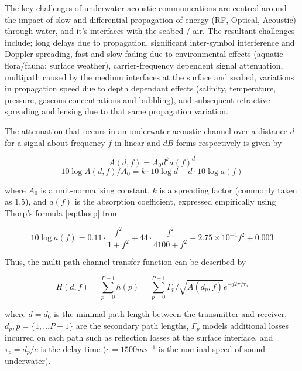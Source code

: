 \documentclass[runningheads,a4paper]{llncs}
\begin{document}
The key challenges of underwater acoustic communications are centred around the impact of slow and differential propagation of energy (RF, Optical, Acoustic) through water, and it's interfaces with the seabed / air.
The resultant challenges include; long delays due to propagation, significant inter-symbol interference and Doppler spreading, fast and slow fading due to environmental effects (aquatic flora/fauna; surface weather), carrier-frequency dependent signal attenuation, multipath caused by the medium interfaces at the surface and seabed, variations in propagation speed due to depth dependant effects (salinity, temperature, pressure, gaseous concentrations and bubbling), and subsequent refractive spreading and lensing due to that same propagation variation\cite{Partan2006}.

The attenuation that occurs in an underwater acoustic channel over a distance $d$ for a signal about frequency $f$ in linear and $dB$ forms respectively is given by

\begin{equation}
  \label{eq:acoattenuation}
  A(d,f) = A_0d^ka(f)^d
\end{equation}
\begin{equation}
  \label{eq:acoattenuationdb}
  10 \log A(d,f)/A_0 = k \cdot 10 \log d + d \cdot 10 \log a(f)
\end{equation}

where $A_0$ is a unit-normalising constant, $k$ is a spreading factor (commonly taken as 1.5), and $a(f)$ is the absorption coefficient, expressed empirically using Thorp's formula \eqref{eq:thorp} from \cite{Stojanovic2007}

\begin{equation}
  \label{eq:thorp}
  10 \log a(f) = 0.11 \cdot \frac{f^2}{1+f^2} + 44\cdot\frac{f^2}{4100+f^2}+ 2.75\times10^{-4} f^2 + 0.003
\end{equation}


Thus, the multi-path channel transfer function can be described by 

\begin{equation}
  \label{eq:acomultipath}
  H(d,f) =\sum_{p=0}^{P-1} h(p) = \sum_{p=0}^{P-1} \Gamma_p / \sqrt{A(d_p,f)}e^{-j 2 \pi f \tau_p}
\end{equation}

where $d=d_0$ is the minimal path length between the transmitter and receiver, $d_p,p=\{1,\dots P-1\}$ are the secondary path lengths, $\Gamma_p$ models additional losses incurred on each path such as reflection losses at the surface interface, and $\tau_p = d_p/c$ is the delay time ($c = 1500 ms^{-1}$ is the nominal speed of sound underwater).
\end{document}
